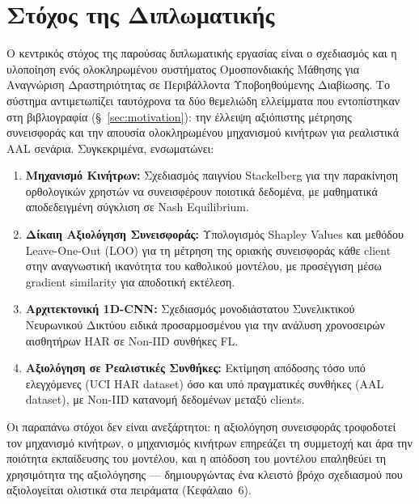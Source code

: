 
\section{Στόχος της Διπλωματικής}
\label{sec:objective}

Ο κεντρικός στόχος της παρούσας διπλωματικής εργασίας είναι ο σχεδιασμός
και η υλοποίηση ενός ολοκληρωμένου συστήματος Ομοσπονδιακής Μάθησης για
Αναγνώριση Δραστηριότητας σε Περιβάλλοντα Υποβοηθούμενης Διαβίωσης. Το
σύστημα αντιμετωπίζει ταυτόχρονα τα δύο θεμελιώδη ελλείμματα που
εντοπίστηκαν στη βιβλιογραφία (§~\ref{sec:motivation}): την έλλειψη
αξιόπιστης μέτρησης συνεισφοράς και την απουσία ολοκληρωμένου μηχανισμού
κινήτρων για ρεαλιστικά AAL σενάρια. Συγκεκριμένα, ενσωματώνει:

\begin{enumerate}
    \item \textbf{Μηχανισμό Κινήτρων:} Σχεδιασμός παιγνίου Stackelberg
    για την παρακίνηση ορθολογικών χρηστών να συνεισφέρουν ποιοτικά
    δεδομένα, με μαθηματικά αποδεδειγμένη σύγκλιση σε Nash Equilibrium.

    \item \textbf{Δίκαιη Αξιολόγηση Συνεισφοράς:} Υπολογισμός Shapley
    Values και μεθόδου Leave-One-Out (LOO) για τη μέτρηση της οριακής
    συνεισφοράς κάθε client στην αναγνωστική ικανότητα του καθολικού
    μοντέλου, με προσέγγιση μέσω gradient similarity για αποδοτική
    εκτέλεση.

    \item \textbf{Αρχιτεκτονική 1D-CNN:} Σχεδιασμός μονοδιάστατου
    Συνελικτικού Νευρωνικού Δικτύου ειδικά προσαρμοσμένου για την
    ανάλυση χρονοσειρών αισθητήρων HAR σε Non-IID συνθήκες FL.

    \item \textbf{Αξιολόγηση σε Ρεαλιστικές Συνθήκες:} Εκτίμηση
    απόδοσης τόσο υπό ελεγχόμενες (UCI HAR dataset) όσο και υπό
    πραγματικές συνθήκες (AAL dataset), με Non-IID κατανομή
    δεδομένων μεταξύ clients.
\end{enumerate}

Οι παραπάνω στόχοι δεν είναι ανεξάρτητοι: η αξιολόγηση συνεισφοράς τροφοδοτεί τον μηχανισμό κινήτρων, ο μηχανισμός κινήτρων επηρεάζει τη συμμετοχή και άρα την ποιότητα εκπαίδευσης του μοντέλου, και η απόδοση του μοντέλου επαληθεύει τη χρησιμότητα της αξιολόγησης — δημιουργώντας ένα κλειστό βρόχο σχεδιασμού που αξιολογείται ολιστικά στα πειράματα (Κεφάλαιο~6).
